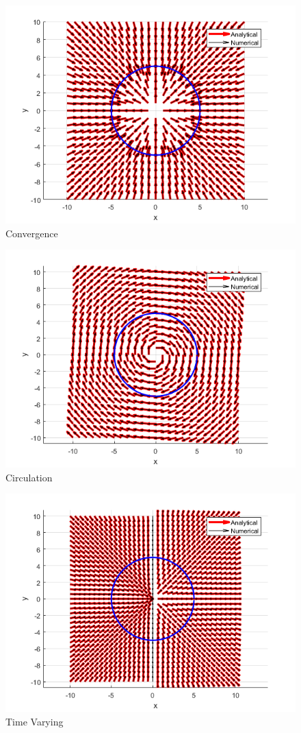 \documentclass[numbered,pdftex]{ohio-etd}
\begin{document}
\begin{figure}[h]
	\centering
	\includegraphics[width=0.7\linewidth]{PaperFigures/convergence}
	\caption{Convergence}
	\label{fig:convergence}
	
\end{figure}

\begin{figure}[h]
	\centering
	\includegraphics[width=0.7\linewidth]{PaperFigures/circulation}
	\caption{Circulation}
	\label{fig:circulation}
\end{figure}

\begin{figure}[h]
	\centering
	\includegraphics[width=0.7\linewidth]{"PaperFigures/time varying"}
	\caption{Time Varying}
	\label{fig:time-varying}
\end{figure}
\end{document}
